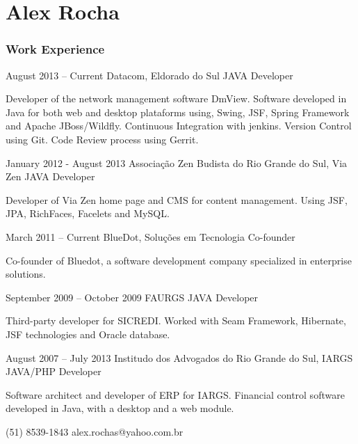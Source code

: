 \documentclass{tccv}
\begin{document}
\part{Alex Rocha}

\section{Work Experience}

\begin{eventlist}

\item{August 2013 -- Current}
    {Datacom, Eldorado do Sul}
    {JAVA Developer}

    Developer of the network management software DmView.
    Software developed in Java for both web and desktop plataforms using, Swing, JSF, Spring Framework and Apache JBoss/Wildfly.
    Continuous Integration with jenkins. Version Control using Git. Code Review process using
    Gerrit.

\item{January 2012 - August 2013}
    {Associação Zen Budista do Rio Grande do Sul, Via Zen}
    {JAVA Developer}

    Developer of Via Zen home page and CMS for content management. Using JSF, JPA, RichFaces, Facelets and MySQL.

\item{March 2011 -- Current}
    {BlueDot, Soluções em Tecnologia}
    {Co-founder}

    Co-founder of Bluedot, a software development company specialized in enterprise solutions.

\item{September 2009 -- October 2009}
    {FAURGS}
    {JAVA Developer}

    Third-party developer for SICREDI\@. Worked with Seam Framework, Hibernate, JSF technologies and Oracle
    database.

\item{August 2007 -- July 2013}
    {Institudo dos Advogados do Rio Grande do Sul, IARGS}
    {JAVA/PHP Developer}

    Software architect and developer of ERP for IARGS\@.
    Financial control software developed in Java, with a desktop and a web module.

\end{eventlist}

{(51) 8539-1843 }
{alex.rochas@yahoo.com.br}
\end{document}
